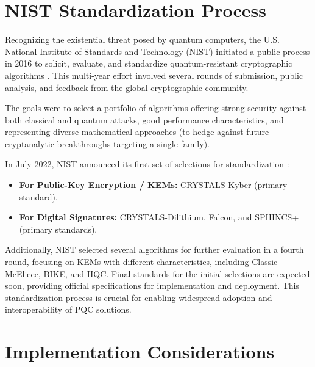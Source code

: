 \section{NIST Standardization Process}

Recognizing the existential threat posed by quantum computers, the U.S. National Institute of Standards and Technology (NIST) initiated a public process in 2016 to solicit, evaluate, and standardize quantum-resistant cryptographic algorithms \parencite{nist_pqc}. This multi-year effort involved several rounds of submission, public analysis, and feedback from the global cryptographic community.

The goals were to select a portfolio of algorithms offering strong security against both classical and quantum attacks, good performance characteristics, and representing diverse mathematical approaches (to hedge against future cryptanalytic breakthroughs targeting a single family).

In July 2022, NIST announced its first set of selections for standardization \parencite{nist_pqc_status_report_ir8413}:
\begin{itemize}
    \item \textbf{For Public-Key Encryption / KEMs:} CRYSTALS-Kyber (primary standard).
    \item \textbf{For Digital Signatures:} CRYSTALS-Dilithium, Falcon, and SPHINCS+ (primary standards).
\end{itemize}
Additionally, NIST selected several algorithms for further evaluation in a fourth round, focusing on KEMs with different characteristics, including Classic McEliece, BIKE, and HQC. Final standards for the initial selections are expected soon, providing official specifications for implementation and deployment. This standardization process is crucial for enabling widespread adoption and interoperability of PQC solutions.
\newpage

\section{Implementation Considerations}

